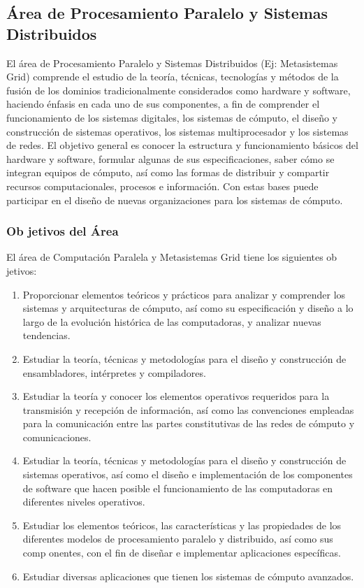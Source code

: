 \subsection{\'Area de Procesamiento Paralelo y Sistemas Distribuidos}

El \'area de Procesamiento Paralelo y Sistemas Distribuidos (Ej: Metasistemas Grid) comprende el estudio de la teor\'ia, t\'ecnicas, tecnolog\'ias y m\'etodos de la fusi\'on de los dominios tradicionalmente considerados como hardware y software, haciendo \'enfasis en cada uno de sus componentes, a fin de comprender el funcionamiento de los sistemas digitales, los sistemas de c\'omputo, el dise\~no y construcci\'on de sistemas operativos, los sistemas multiprocesador y los sistemas de redes. El objetivo general es conocer la estructura y funcionamiento b\'asicos del hardware y software, formular algunas de sus especificaciones, saber c\'omo se integran equipos de c\'omputo, as\'i como las formas de distribuir y compartir recursos computacionales, procesos e informaci\'on. Con estas bases puede participar en el dise\~no de nuevas organizaciones para los sistemas de c\'omputo.

\subsubsection{Ob jetivos del \'Area}

El \'area de Computaci\'on Paralela y Metasistemas Grid tiene los siguientes ob jetivos: 
\begin{enumerate}
\item Proporcionar elementos te\'oricos y pr\'acticos para analizar y comprender los sistemas y arquitecturas de c\'omputo, as\'i como su especificaci\'on y dise\~no a lo largo de la evoluci\'on hist\'orica de las computadoras, y analizar nuevas tendencias.
\item Estudiar la teor\'ia, t\'ecnicas y metodolog\'ias para el dise\~no y construcci\'on de ensambladores, int\'erpretes y compiladores.
\item Estudiar la teor\'ia y conocer los elementos operativos requeridos para la transmisi\'on y recepci\'on de informaci\'on, as\'i como las convenciones empleadas para la comunicaci\'on entre las partes constitutivas de las redes de c\'omputo y comunicaciones.
\item Estudiar la teor\'ia, t\'ecnicas y metodolog\'ias para el dise\~no y construcci\'on de sistemas operativos, as\'i como el dise\~no e implementaci\'on de los componentes de software que hacen posible el funcionamiento de las computadoras en diferentes niveles operativos.
\item Estudiar los elementos te\'oricos, las caracter\'isticas y las propiedades de los diferentes modelos de procesamiento paralelo y distribuido, as\'i como sus comp onentes, con el fin de dise\~nar e implementar aplicaciones espec\'ificas.
\item Estudiar diversas aplicaciones que tienen los sistemas de c\'omputo avanzados.
\end{enumerate}

